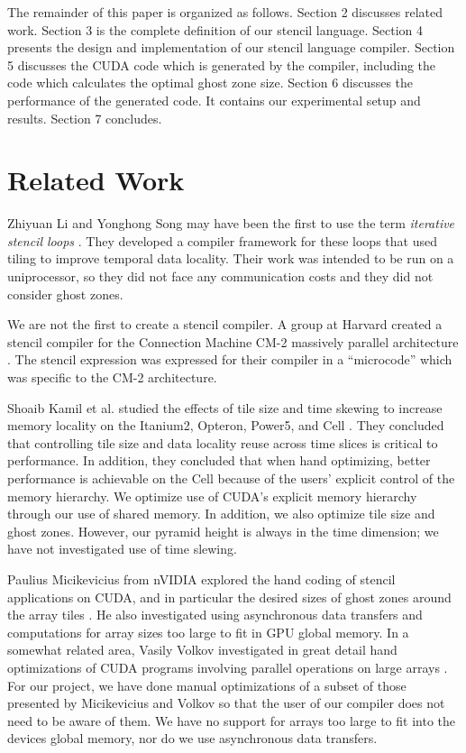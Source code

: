 \documentclass{styles/sig-alternate}
\begin{document}
The remainder of this paper is organized as follows.  Section 2
discusses related work.  Section 3 is the complete definition of our stencil
language.  Section 4 presents the design and implementation of our
stencil language compiler.  Section 5 discusses the CUDA code which is
generated by the compiler, including the code which calculates the
optimal ghost zone size.  Section 6 discusses the performance of the
generated code.  It contains our experimental setup and results.
Section 7 concludes.

\section{Related Work}

Zhiyuan Li and Yonghong Song may have been the first to use the term
{\em iterative stencil loops} \cite{li}.  They developed a compiler
framework for these loops that used tiling to improve temporal data
locality.  Their work was intended to be run on a uniprocessor, so
they did not face any communication costs and they did not consider
ghost zones.

We are not the first to create a stencil compiler.  A group at Harvard
created a stencil compiler for the Connection Machine CM-2 massively
parallel architecture \cite{cm2}.  The stencil expression was
expressed for their compiler in a ``microcode'' which was specific to
the CM-2 architecture.

Shoaib Kamil et al. studied the effects of tile size and time skewing
to increase memory locality on the Itanium2, Opteron, Power5, and Cell
\cite{kamil}.  They concluded that controlling tile size and data
locality reuse across time slices is critical to performance.  In
addition, they concluded that when hand optimizing, better performance
is achievable on the Cell because of the users' explicit control of
the memory hierarchy.  We optimize use of CUDA's explicit memory hierarchy 
through our use of shared memory.  In addition, we also optimize tile
size and ghost zones.  However, our pyramid height is always in the time
dimension; we have not investigated use of time slewing.

Paulius Micikevicius from nVIDIA explored the hand coding of stencil
applications on CUDA, and in particular the desired sizes of ghost
zones around the array tiles \cite{Micikevicius}.  He also
investigated using asynchronous data transfers and computations for
array sizes too large to fit in GPU global memory.  In a somewhat
related area, Vasily Volkov investigated in great detail hand
optimizations of CUDA programs involving parallel operations on large
arrays \cite{volkov}.  For our project, we have done manual
optimizations of a subset of those presented by Micikevicius and Volkov so
that the user of our compiler does not need to be aware of them.  We have
no support for arrays too large to fit into the devices global memory,
nor do we use asynchronous data transfers.
\end{document}
